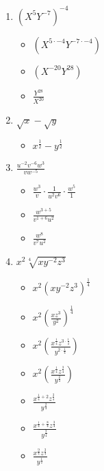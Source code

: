 \documentclass{article}
\begin{document}
\begin{onehalfspace}
\begin{enumerate}[start=41]
        \item $(X^{5}Y^{-7})^{-4}$
        \begin{itemize}
            \item $\left( X^{5 \cdot -4} Y^{-7 \cdot -4} \right)$
            \item $\left( X^{-20} Y^{28} \right)$
            \item $\frac{Y^{28}}{X^{20}}$
        \end{itemize}

        \item $\sqrt{x} - \sqrt{y}$
        \begin{itemize}
            \item $x^{\frac{1}{2}} - y^{\frac{1}{2}}$
        \end{itemize}

        \item $\frac{u^{-2}v^{-6}w^{3}}{vw^{-5}}$
        \begin{itemize}
            \item $\frac{w^{3}}{v} \cdot \frac{1}{u^{2}v^{6}} \cdot \frac{w^{5}}{1}$
            \item $\frac{w^{3 + 5}}{v^{1 + 6} u^{2}}$
            \item $\frac{w^{8}}{v^{7} u^{2}}$
        \end{itemize}

        \item $x^{2}\sqrt[4]{xy^{-2}z^{3}}$
        \begin{itemize}
            \item $x^{2} \left( xy^{-2}z^{3} \right)^{\frac{1}{4}}$
            \item $x^{2} \left( \frac{xz^{3}}{y^{2}} \right)^{\frac{1}{4}}$
            \item $x^{2} \left( \frac{x^{\frac{1}{4}}z^{3 \cdot \frac{1}{4}}}{y^{2 \cdot \frac{1}{4}}} \right)$
            \item $x^{2} \left( \frac{x^{\frac{1}{4}}z^{\frac{3}{4}}}{y^{\frac{2}{4}}} \right)$
            \item $\frac{x^{\frac{1}{4} + 2}z^{\frac{3}{4}}}{y^{\frac{2}{4}}}$
            \item $\frac{x^{\frac{1}{4} + \frac{8}{4}}z^{\frac{3}{4}}}{y^{\frac{2}{4}}}$
            \item $\frac{x^{\frac{9}{4}}z^{\frac{3}{4}}}{y^{\frac{1}{2}}}$
        \end{itemize}


\end{enumerate}
\end{onehalfspace}
\end{document}
